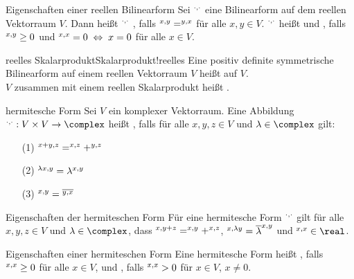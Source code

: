 \begin{Def}{Eigenschaften einer reellen Bilinearform}
    Sei $\sp{\cdot, \cdot}$ eine Bilinearform auf dem reellen Vektorraum $V$.
    Dann heißt $\sp{\cdot, \cdot}$ ,
    falls $\sp{x, y} = \sp{y, x}$ für alle $x, y \in V$.
    $\sp{\cdot, \cdot}$ heißt  und
    , falls $\sp{x, y} \ge 0$ und
    $\sp{x, x} = 0 \;\Leftrightarrow\; x = 0$ für alle $x \in V$.
\end{Def}

\begin{xDef}{reelles Skalarprodukt}{Skalarprodukt!reelles}
    Eine positiv definite symmetrische Bilinearform auf einem reellen
    Vektorraum $V$ heißt
     auf $V$. \\
    $V$ zusammen mit einem reellen Skalarprodukt heißt
    .
\end{xDef}

\begin{Def}{hermitesche Form}
    Sei $V$ ein komplexer Vektorraum.
    Eine Abbildung $\sp{\cdot, \cdot}: V \times V \rightarrow \complex$
    heißt , falls für alle $x, y, z \in V$ und
    $\lambda \in \complex$ gilt:
    \begin{enumerate}
        \item[(1)] $\sp{x + y, z} = \sp{x, z} + \sp{y, z}$
        
        \item[(2)] $\sp{\lambda x, y} = \lambda \sp{x, y}$
        
        \item[(3)] $\sp{x, y} = \overline{\sp{y, x}}$
    \end{enumerate}
\end{Def}

\begin{Lemma}{Eigenschaften der hermiteschen Form}
    Für eine hermitesche Form $\sp{\cdot, \cdot}$ gilt für alle
    $x, y, z \in V$ und $\lambda \in \complex$, dass
    $\sp{x, y + z} = \sp{x, y} + \sp{x, z}$,
    $\sp{x, \lambda y} = \overline{\lambda} \sp{x, y}$ und
    $\sp{x, x} \in \real$.
\end{Lemma}

\begin{Def}{Eigenschaften einer hermiteschen Form}
    Eine hermitesche Form heißt , falls
    $\sp{x, x} \ge 0$ für alle $x \in V$, und , falls
    $\sp{x, x} > 0$ für $x \in V$, $x \not= 0$.
\end{Def}

